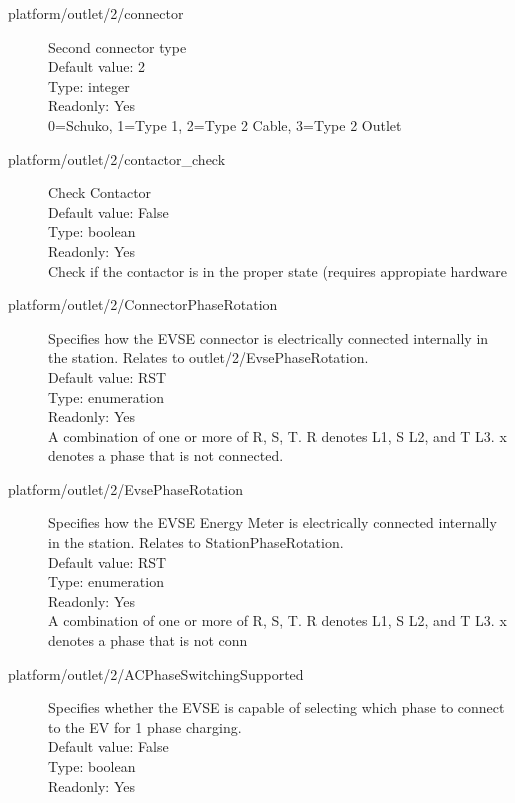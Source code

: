 \begin{description}
\item[platform/outlet/2/connector] Second connector type\\
  Default value: 2\\
  Type: integer\\
  Readonly: Yes\\
  0=Schuko, 1=Type 1, 2=Type 2 Cable, 3=Type 2 Outlet\\

\item[platform/outlet/2/contactor\_check] Check Contactor\\
  Default value: False\\
  Type: boolean\\
  Readonly: Yes\\
  Check if the contactor is in the proper state (requires appropiate hardware\\

\item[platform/outlet/2/ConnectorPhaseRotation] Specifies how the EVSE connector is electrically connected internally in the station. Relates to outlet/2/EvsePhaseRotation.\\
  Default value: RST\\
  Type: enumeration\\
  Readonly: Yes\\
  A combination of one or more of R, S, T. R denotes L1, S L2, and T L3. x denotes a phase that is not connected.\\

\item[platform/outlet/2/EvsePhaseRotation] Specifies how the EVSE Energy Meter is electrically connected internally in the station. Relates to StationPhaseRotation.\\
  Default value: RST\\
  Type: enumeration\\
  Readonly: Yes\\
  A combination of one or more of R, S, T. R denotes L1, S L2, and T L3. x denotes a phase that is not conn\\

\item[platform/outlet/2/ACPhaseSwitchingSupported] Specifies whether the EVSE is capable of selecting which phase to connect to the EV for 1 phase charging.\\
  Default value: False\\
  Type: boolean\\
  Readonly: Yes\\


\end{description}
